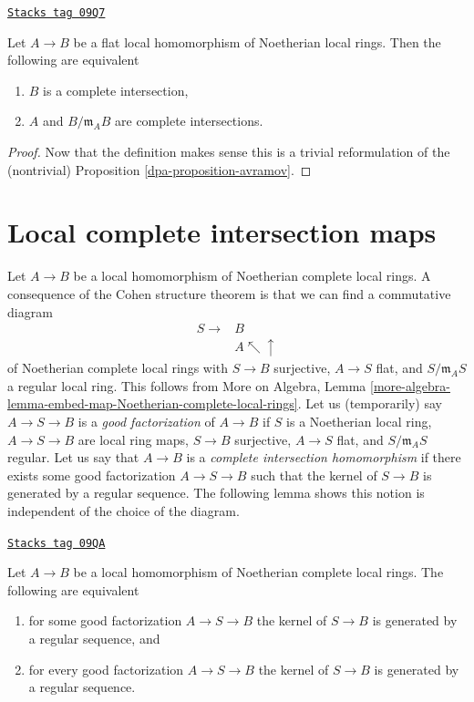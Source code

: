 \begin{lemma}[Avramov]
\label{dpa-lemma-avramov}
\href{https://stacks.math.columbia.edu/tag/09Q7}{\texttt{Stacks tag 09Q7}}

Let $A \to B$ be a flat local homomorphism of Noetherian local rings.
Then the following are equivalent
\begin{enumerate}
\item $B$ is a complete intersection,
\item $A$ and $B/\mathfrak m_A B$ are complete intersections.
\end{enumerate}
\end{lemma}

\begin{proof}

Now that the definition makes sense this is a trivial reformulation
of the (nontrivial) Proposition \ref{dpa-proposition-avramov}.
\end{proof}

\section{Local complete intersection maps}
\label{dpa-section-lci-homomorphisms}
Let $A \to B$ be a local homomorphism of Noetherian complete local rings.
A consequence of the Cohen structure theorem is that we can find a
commutative diagram
$$
\begin{array}{cc}S \longrightarrow & B \\  & A \nwarrow\uparrow\end{array}
$$
of Noetherian complete local rings with
$S \to B$ surjective, $A \to S$ flat, and
$S/\mathfrak m_A S$ a regular local ring. This follows from
More on Algebra, Lemma
\ref{more-algebra-lemma-embed-map-Noetherian-complete-local-rings}.
Let us (temporarily) say $A \to S \to B$ is a {\it good factorization}
of $A \to B$ if $S$ is a Noetherian local ring,
$A \to S \to B$ are local ring maps,
$S \to B$ surjective, $A \to S$ flat, and $S/\mathfrak m_AS$ regular.
Let us say that $A \to B$ is a
{\it complete intersection homomorphism}
if there exists some good factorization $A \to S \to B$
such that the kernel of $S \to B$ is generated by a regular sequence.
The following lemma shows this notion is independent of
the choice of the diagram.

\begin{lemma}
\label{dpa-lemma-ci-map-well-defined}
\href{https://stacks.math.columbia.edu/tag/09QA}{\texttt{Stacks tag 09QA}}

Let $A \to B$ be a local homomorphism of Noetherian complete local rings.
The following are equivalent
\begin{enumerate}
\item for some good factorization $A \to S \to B$ the kernel of
$S \to B$ is generated by a regular sequence, and
\item for every good factorization $A \to S \to B$ the kernel of
$S \to B$ is generated by a regular sequence.
\end{enumerate}
\end{lemma}

